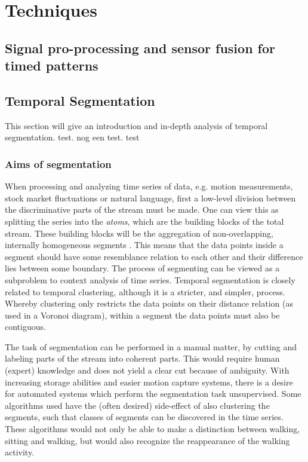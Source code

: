 
\chapter{Techniques} %

\label{Chapter2} %



\section{Signal pro-processing and sensor fusion for timed patterns}

\section{Temporal Segmentation}

This section will give an introduction and in-depth analysis of temporal 
segmentation. test. nog een test. test

\subsection{Aims of segmentation}
When processing and analyzing time series of data, e.g. motion measurements, 
stock market fluctuations or natural language, first a low-level division 
between the discriminative parts of the stream must be made. One can view this 
as splitting the series into the \emph{atoms}, which are the building blocks 
of the total stream. These building blocks will be the aggregation of 
non-overlapping, internally homogeneous segments \cite{himberg2001time}. This 
means that the data points inside a segment should have some resemblance 
relation to each other and their difference lies between some boundary. The 
process of segmenting can be viewed as a subproblem to context analysis of 
time series. Temporal segmentation is closely related to temporal clustering, 
although it is a stricter, and simpler, process. Whereby clustering only 
restricts the data points on their distance relation (as used in a Voronoi 
diagram), within a segment the data points must also be contiguous.

The task of segmentation can be performed in a manual 
matter, by cutting and labeling parts of the stream into coherent parts. This 
would require human (expert) knowledge and does not yield a clear cut because 
of ambiguity. With increasing storage abilities and easier motion capture 
systems, there is a desire for automated systems which perform the 
segmentation task unsupervised. Some algorithms used have the (often desired) 
side-effect of also clustering the segments, such that classes of segments can 
be discovered in the time series. These algorithms would not only be able to 
make a distinction between walking, sitting and walking, but would also 
recognize the reappearance of the walking activity.

